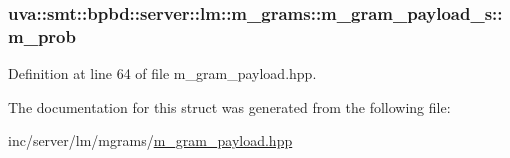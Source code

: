 \subsubsection[{m\+\_\+prob}]{ uva\+::smt\+::bpbd\+::server\+::lm\+::m\+\_\+grams\+::m\+\_\+gram\+\_\+payload\+\_\+s\+::m\+\_\+prob}\label{structuva_1_1smt_1_1bpbd_1_1server_1_1lm_1_1m__grams_1_1m__gram__payload__s_ac9f21db3ce3b299ec639d137fb072c52}


Definition at line 64 of file m\+\_\+gram\+\_\+payload.\+hpp.



The documentation for this struct was generated from the following file\+:\begin{DoxyCompactItemize}
\item 
inc/server/lm/mgrams/\hyperlink{m__gram__payload_8hpp}{m\+\_\+gram\+\_\+payload.\+hpp}\end{DoxyCompactItemize}

